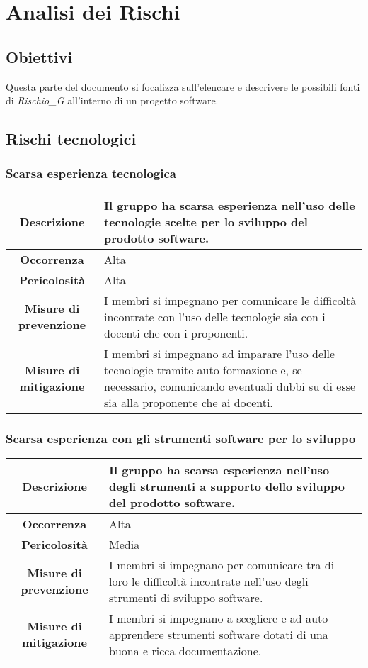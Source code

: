 \section{Analisi dei Rischi}
\subsection{Obiettivi}
Questa parte del documento si focalizza sull'elencare e descrivere le possibili fonti di \textit{Rischio_G} all'interno di un progetto software.
\subsection{Rischi tecnologici}
\subsubsection{Scarsa esperienza tecnologica}
\begin{tabular}{|c|p{10cm}|}
\hline
\textbf{Descrizione} & Il gruppo ha scarsa esperienza nell'uso delle tecnologie scelte per lo sviluppo del prodotto software. \\
\hline
\textbf{Occorrenza} & Alta \\
\hline
\textbf{Pericolosità} & Alta \\
\hline
\textbf{Misure di prevenzione} & I membri si impegnano per comunicare le difficoltà incontrate con l'uso delle tecnologie sia con i docenti che con i proponenti. \\
\hline
\textbf{Misure di mitigazione} & I membri si impegnano ad imparare l'uso delle tecnologie tramite auto-formazione e, se necessario, comunicando eventuali dubbi su di esse sia alla proponente che ai docenti. \\
\hline
\end{tabular}

\subsubsection{Scarsa esperienza con gli strumenti software per lo sviluppo}
\begin{tabular}{|c|p{10cm}|}
\hline
\textbf{Descrizione} & Il gruppo ha scarsa esperienza nell'uso degli strumenti a supporto dello sviluppo del prodotto software. \\
\hline
\textbf{Occorrenza} & Alta \\
\hline
\textbf{Pericolosità} & Media \\
\hline
\textbf{Misure di prevenzione} & I membri si impegnano per comunicare tra di loro le difficoltà incontrate nell'uso degli strumenti di sviluppo software. \\
\hline
\textbf{Misure di mitigazione} & I membri si impegnano a scegliere e ad auto-apprendere strumenti software dotati di una buona e ricca documentazione.\\
\hline
\end{tabular}

